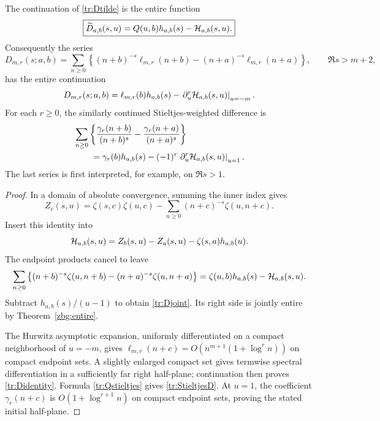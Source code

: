 \begin{theorem}
\label{tr:jointD}
The continuation of \eqref{tr:Dtilde} is the entire function
\begin{equation}\label{tr:Djoint}
 \boxed{\widetilde D_{a,b}(s,u)
       =Q(u,b)h_{a,b}(s)-\mathcal H_{a,b}(s,u).}
\end{equation}
Consequently the series
\begin{equation}\label{tr:D}
 D_{m,r}(s;a,b)=\sum_{n\geq0}\left\{
 (n+b)^{-s}\ell_{m,r}(n+b)
 -(n+a)^{-s}\ell_{m,r}(n+a)\right\},
 \qquad \Re s>m+2,
\end{equation}
has the entire continuation
\begin{equation}\label{tr:Didentity}
 D_{m,r}(s;a,b)=\ell_{m,r}(b)h_{a,b}(s)
       -\left.\partial_u^r\mathcal H_{a,b}(s,u)\right|_{u=-m}.
\end{equation}
For each $r\geq0$, the similarly continued Stieltjes-weighted difference is
\begin{align}
 &\sum_{n\geq0}\left\{
 \frac{\gamma_r(n+b)}{(n+b)^s}
 -\frac{\gamma_r(n+a)}{(n+a)^s}\right\}
 \notag\\
 &\qquad=\gamma_r(b)h_{a,b}(s)
       -(-1)^r\left.\partial_u^r\mathcal H_{a,b}(s,u)\right|_{u=1}.
 \label{tr:StieltjesD}
\end{align}
The last series is first interpreted, for example, on $\Re s>1$.
\end{theorem}

\begin{proof}
In a domain of absolute convergence, summing the inner index gives
\[
 Z_c(s,u)=\zeta(s,c)\zeta(u,c)
          -\sum_{n\geq0}(n+c)^{-s}\zeta(u,n+c).
\]
Insert this identity into
\[
 \mathcal H_{a,b}(s,u)=Z_b(s,u)-Z_a(s,u)-\zeta(s,a)h_{a,b}(u).
\]
The endpoint products cancel to leave
\[
 \sum_{n\geq0}\left\{(n+b)^{-s}\zeta(u,n+b)
               -(n+a)^{-s}\zeta(u,n+a)\right\}
 =\zeta(u,b)h_{a,b}(s)-\mathcal H_{a,b}(s,u).
\]
Subtract $h_{a,b}(s)/(u-1)$ to obtain \eqref{tr:Djoint}.
Its right side is jointly entire by Theorem~\ref{zbg:entire}.

The Hurwitz asymptotic expansion, uniformly differentiated on a compact
neighborhood of $u=-m$, gives
$\ell_{m,r}(n+c)=O(n^{m+1}(1+\log^r n))$ on compact endpoint sets.
A slightly enlarged compact set gives termwise spectral differentiation
in a sufficiently far right half-plane; continuation then proves
\eqref{tr:Didentity}. Formula \eqref{tr:Qstieltjes} gives
\eqref{tr:StieltjesD}. At $u=1$, the coefficient $\gamma_r(n+c)$ is
$O(1+\log^{r+1}n)$ on compact endpoint sets, proving the stated
initial half-plane.
\end{proof}

